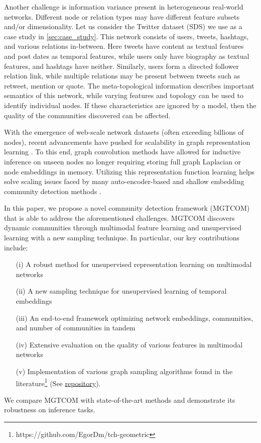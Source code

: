 Another challenge is information variance present in heterogeneous real-world networks. 
Different node or relation types may have different feature subsets and/or dimensionality.
Let us consider the Twitter dataset (SDS) we use as a case study in \cref{sec:case_study}. 
This network consists of users, tweets, hashtags, and various relations in-between. 
Here tweets have content as textual features and post dates as temporal features, while users only have biography as textual features, and hashtags have neither. 
Similarly, users form a directed follower relation link, while multiple relations may be present between tweets such as retweet, mention or quote.
The meta-topological information describes important semantics of this network, while varying features and topology can be used to identify individual nodes.
If these characteristics are ignored by a model, then the quality of the communities discovered can be affected. 

With the emergence of web-scale network datasets (often exceeding billions of nodes), recent advancements have pushed for scalability in graph representation learning \cite{hamiltonInductiveRepresentationLearning2017, yingGraphConvolutionalNeural2018}. 
To this end, graph convolution methods have allowed for inductive inference on unseen nodes no longer requiring storing full graph Laplacian or node embeddings in memory. 
Utilizing this representation function learning helps solve scaling issues faced by many auto-encoder-based and shallow embedding community detection methods \cite{mehtaStochasticBlockmodelsMeet2019, panAdversariallyRegularizedGraph2018, wangDynamicCommunityDetection2017a}.


In this paper, we propose a novel community detection framework (MGTCOM) that is able to address the aforementioned challenges.
MGTCOM discovers dynamic communities through multimodal feature learning and unsupervised learning with a new sampling technique. 
In particular, our key contributions include:
%
\begin{itemize}[leftmargin=*]
    \item[(i)] A robust method for unsupervised representation learning on multimodal networks
    \item[(ii)] A new sampling technique for unsupervised learning of temporal embeddings
    \item[(iii)] An end-to-end framework optimizing network embeddings, communities, and number of communities in tandem
    \item[(iv)] Extensive evaluation on the quality of various features in multimodal networks
    \item[(v)] Implementation of various graph sampling algorithms found in the literature\footnote{https://github.com/EgorDm/tch-geometric} (See \href{https://anaconda.org/egordm/tch_geometric}{repository}).
\end{itemize}
%
We compare MGTCOM with state-of-the-art methods and demonstrate its robustness on inference tasks.

